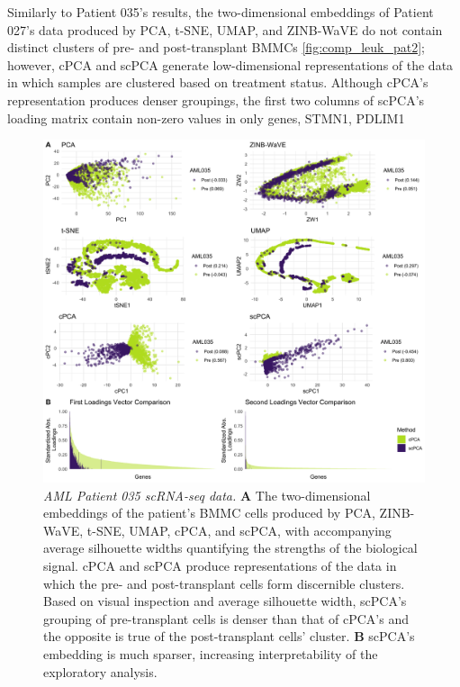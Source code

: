 Similarly to Patient 035's results, the two-dimensional embeddings of Patient 027's data produced by PCA, t-SNE, UMAP,  and ZINB-WaVE do not contain distinct clusters of pre- and post-transplant BMMCs \ref{fig:comp_leuk_pat2}; however, cPCA and scPCA generate low-dimensional representations of the data in which samples are clustered based on treatment status. Although cPCA's representation produces denser groupings, the first two columns of scPCA's loading matrix contain non-zero values in only  genes, STMN1,  PDLIM1

\FloatBarrier

\begin{figure}
  \centering
  \includegraphics[width = \textwidth]{figures/aml035_results}
  \caption{{\em AML Patient 035 scRNA-seq data.} 
  \textbf{A} The two-dimensional embeddings of the patient's BMMC cells produced by PCA, ZINB-WaVE, t-SNE, UMAP, cPCA, and scPCA, with accompanying average silhouette widths quantifying the strengths of the biological signal. cPCA and scPCA produce representations of the data in which the pre- and post-transplant cells form discernible clusters. Based on visual inspection and average silhouette width, scPCA's grouping of pre-transplant cells is denser than that of cPCA's and the opposite is true of the post-transplant cells' cluster. \textbf{B} scPCA's embedding is much sparser, increasing interpretability of the exploratory analysis.}
  \label{fig:comp_leuk_pat1}
\end{figure}